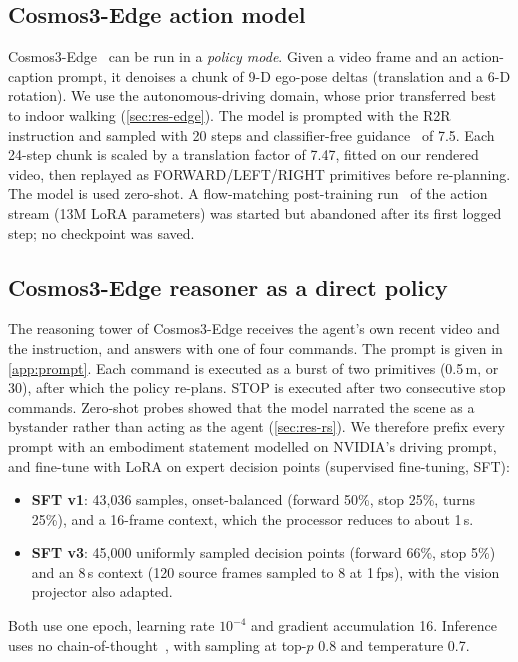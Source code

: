 \documentclass[11pt]{article}
\begin{document}
\subsection{Cosmos3-Edge action model}
\label{sec:m-edge}
Cosmos3-Edge~\citep{nvidia2026cosmos3edge} can be run in a \emph{policy mode}. Given a video frame and an
action-caption prompt, it denoises a chunk of 9-D ego-pose deltas (translation and a 6-D rotation). We use the
autonomous-driving domain, whose prior transferred best to indoor walking (\cref{sec:res-edge}). The model is prompted
with the R2R instruction and sampled with 20 steps and classifier-free guidance~\citep{ho2022cfg} of 7.5. Each
24-step chunk is scaled by a translation factor of 7.47, fitted on our rendered video, then replayed as FORWARD/LEFT/RIGHT
primitives before re-planning. The model is used zero-shot. A flow-matching post-training run~\citep{lipman2023flow} of
the action stream (13M LoRA parameters) was started but abandoned after its first logged step; no checkpoint was saved.

\subsection{Cosmos3-Edge reasoner as a direct policy}
\label{sec:m-rs}
The reasoning tower of Cosmos3-Edge receives the agent's own recent video and the instruction, and answers with one
of four commands. The prompt is given in \cref{app:prompt}. Each command is executed as a burst of two primitives
(0.5\,m, or 30\textdegree), after which the policy re-plans. STOP is executed after two consecutive stop commands. Zero-shot
probes showed that the model narrated the scene as a bystander rather than acting as the agent (\cref{sec:res-rs}).
We therefore prefix every prompt with an embodiment statement modelled on NVIDIA's driving prompt, and fine-tune with
LoRA on expert decision points (supervised fine-tuning, SFT):
\begin{itemize}
  \item \textbf{SFT v1}: 43,036 samples, onset-balanced (forward 50\%, stop 25\%, turns 25\%), and a 16-frame
        context, which the processor reduces to about 1\,s.
  \item \textbf{SFT v3}: 45,000 uniformly sampled decision points (forward 66\%, stop 5\%) and an 8\,s context
        (120 source frames sampled to 8 at 1\,fps), with the vision projector also adapted.
\end{itemize}
Both use one epoch, learning rate $10^{-4}$ and gradient accumulation 16. Inference uses no chain-of-thought~\citep{
wei2022cot}, with sampling at top-$p$ 0.8 and temperature 0.7.
\end{document}

